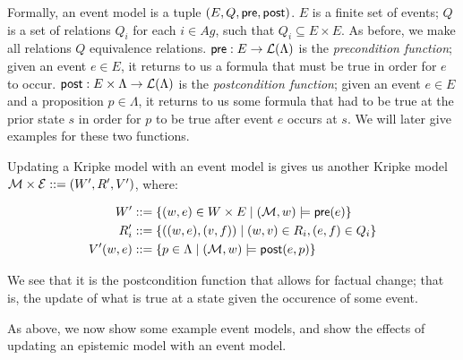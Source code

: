 \documentclass[12pt, a4paper]{article}
\begin{document}
Formally, an event model  is a tuple $(E, Q, \textsf{pre}, \textsf{post})$. $E$ is a finite set
of events; $Q$ is a set of relations $Q_i$ for each $i \in Ag$, such that $Q_i
\subseteq E \times E$. As before, we make all relations $Q$ equivalence
relations. $\textsf{pre} : E \rightarrow \mathcal{L}(\Lambda) $ is the \textit{precondition
  function}; given an event $e \in E$, it returns to us a formula that must be
true in order for $e$ to occur. $\textsf{post} : E \times \Lambda \rightarrow
\mathcal{L}(\Lambda)$ is the \textit{postcondition function}; given an event $e \in
E$ and a proposition $p \in \Lambda$, it returns to us some formula that had to
be true at the prior state $s$ in order for $p$ to be true after event $e$
occurs at $s$. We will later give examples for these two functions.

Updating a Kripke model  with an event model  is gives us another
Kripke model $\mathcal{M} \times \mathcal{E} ::= (W', R', V')$, where:

\begin{align*}
  W'   &::= \left\{(w, e) \in W \times E \mid (\mathcal{M}, w) \models \textsf{pre}(e)\right\} \\
  R_i' &::= \left\{((w, e), (v, f)) \mid (w, v) \in R_i, (e, f) \in Q_i \right\} \\
  V'(w, e) &::= \left\{ p \in \Lambda \mid (\mathcal{M}, w) \models \textsf{post}(e, p) \right\}
\end{align*}

We see that it is the postcondition function that allows for factual change;
that is, the update of what is true at a state given the occurence of some
event.

\bigskip \bigskip \bigskip

As above, we now show some example event models, and show the effects of
updating an epistemic model with an event model.
\end{document}
